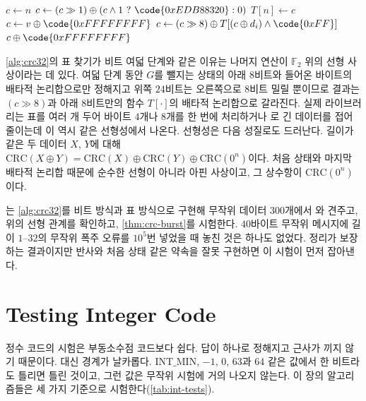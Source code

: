 \begin{algorithm}[htbp]
\begin{algorithmic}[1]
    \State $c\gets n$
     $c\gets(c\gg1)\oplus(c\land1\ ?\ \code{0xEDB88320}:0)$ 
    \EndFor
    \State $T[n]\gets c$
  \EndFor
\EndFunction
{}
  \State $c\gets v\oplus\code{0xFFFFFFFF}$
   $c\gets(c\gg8)\oplus T[(c\oplus d_i)\land\code{0xFF}]$
  \EndFor
  \State \Return $c\oplus\code{0xFFFFFFFF}$
\EndFunction
\end{algorithmic}
\caption{표를 쓰는 CRC-32 (반사형)}
\label{alg:crc32}
\end{algorithm}

\cref{alg:crc32}의 표 찾기가 비트 여덟 단계와 같은 이유는 나머지 연산이 $\mathbb{F}_2$ 위의 선형 사상이라는 데 있다. 여덟 단계 동안 $G$를 뺄지는 상태의 아래 $8$비트와 들어온 바이트의 배타적 논리합으로만 정해지고 위쪽 $24$비트는 오른쪽으로 $8$비트 밀릴 뿐이므로 결과는 $(c\gg8)$과 아래 $8$비트만의 함수 $T[\cdot]$의 배타적 논리합으로 갈라진다. 실제 라이브러리는 표를 여러 개 두어 바이트 $4$개나 $8$개를 한 번에 처리하거나 로 긴 데이터를 접어 줄이는데 이 역시 같은 선형성에서 나온다. 선형성은 다음 성질로도 드러난다. 길이가 같은 두 데이터 $X$, $Y$에 대해 $\mathrm{CRC}(X\oplus Y)=\mathrm{CRC}(X)\oplus\mathrm{CRC}(Y)\oplus\mathrm{CRC}(0^n)$이다. 처음 상태와 마지막 배타적 논리합 때문에 순수한 선형이 아니라 아핀 사상이고, 그 상수항이 $\mathrm{CRC}(0^n)$이다.

는 \cref{alg:crc32}를 비트 방식과 표 방식으로 구현해 무작위 데이터 $300$개에서 와 견주고, 위의 선형 관계를 확인하고, \cref{thm:crc-burst}를 시험한다. $40$바이트 무작위 메시지에 길이 $1$--$32$의 무작위 폭주 오류를 $10^5$번 넣었을 때 놓친 것은 하나도 없었다. 정리가 보장하는 결과이지만 반사와 처음 상태 같은 약속을 잘못 구현하면 이 시험이 먼저 잡아낸다.


\section{Testing Integer Code}
\label{sec:int-testing}

정수 코드의 시험은 부동소수점 코드보다 쉽다. 답이 하나로 정해지고 근사가 끼지 않기 때문이다. 대신 경계가 날카롭다. $\mathrm{INT\_MIN}$, $-1$, $0$, $63$과 $64$ 같은 값에서 한 비트라도 틀리면 틀린 것이고, 그런 값은 무작위 시험에 거의 나오지 않는다. 이 장의 알고리즘들은 세 가지 기준으로 시험한다(\cref{tab:int-tests}).

